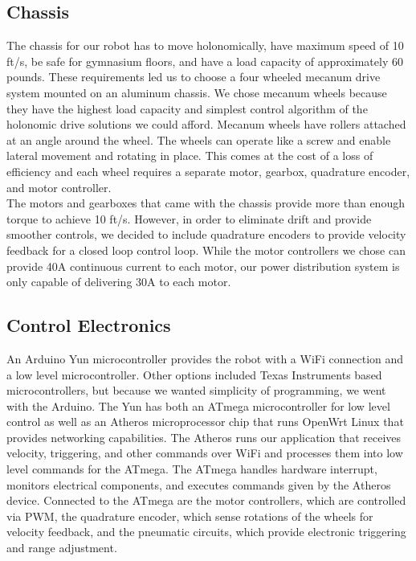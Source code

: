 \documentclass[letterpaper,12pt]{article}
\begin{document}
\subsection{Chassis}
\noindent The chassis for our robot has to move holonomically, have maximum speed of 10 ft/s, be safe for gymnasium floors, and have a load capacity of approximately 60 pounds. These requirements led us to choose a four wheeled mecanum drive system mounted on an aluminum chassis. We chose mecanum wheels because they have the highest load capacity and simplest control algorithm of the holonomic drive solutions we could afford. Mecanum wheels have rollers attached at an angle around the wheel. The wheels can operate like a screw and enable lateral movement and rotating in place. This comes at the cost of a loss of efficiency and each wheel requires a separate motor, gearbox, quadrature encoder, and motor controller. \\

\noindent The motors and gearboxes that came with the chassis provide more than enough torque to achieve 10 ft/s. However, in order to eliminate drift and provide smoother controls, we decided to include quadrature encoders to provide velocity feedback for a closed loop control loop. While the motor controllers we chose can provide 40A continuous current to each motor, our power distribution system is only capable of delivering 30A to each motor.\\

\subsection{Control Electronics}
\noindent An Arduino Yun microcontroller provides the robot with a WiFi connection and a low level microcontroller. Other options included Texas Instruments based microcontrollers, but because we wanted simplicity of programming, we went with the Arduino. The Yun has both an ATmega microcontroller for low level control as well as an Atheros microprocessor chip that runs OpenWrt Linux that provides networking capabilities. The Atheros runs our application that receives velocity, triggering, and other commands over WiFi and processes them into low level commands for the ATmega. The ATmega handles hardware interrupt, monitors electrical components, and executes commands given by the Atheros device. Connected to the ATmega are the motor controllers, which are controlled via PWM, the quadrature encoder, which sense rotations of the wheels for velocity feedback, and the pneumatic circuits, which provide electronic triggering and range adjustment. \\
\end{document}
